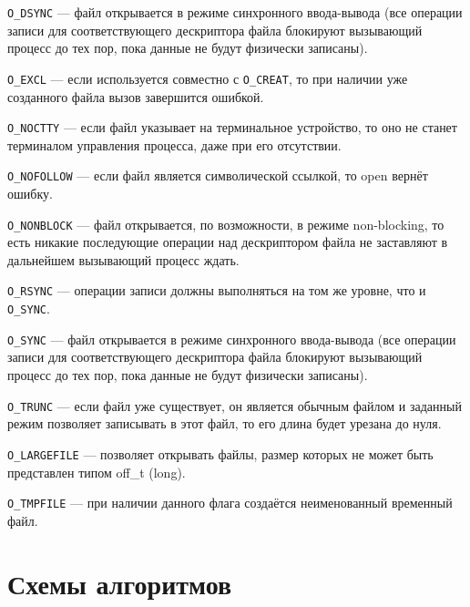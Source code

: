 \texttt{O\_DSYNC} --- файл открывается в режиме синхронного ввода-вывода (все операции записи для соответствующего дескриптора файла блокируют вызывающий процесс до тех пор, пока данные не будут физически записаны).

\texttt{O\_EXCL} --- если используется совместно с \texttt{O\_CREAT}, то при наличии уже созданного файла вызов завершится ошибкой.

\texttt{O\_NOCTTY} --- если файл указывает на терминальное устройство, то оно не станет терминалом управления процесса, даже при его отсутствии.

\texttt{O\_NOFOLLOW} --- если файл является символической ссылкой, то open вернёт ошибку.

\texttt{O\_NONBLOCK} --- файл открывается, по возможности, в режиме non-blocking, то есть никакие последующие операции над дескриптором файла не заставляют в дальнейшем вызывающий процесс ждать.

\texttt{O\_RSYNC} --- операции записи должны выполняться на том же уровне, что и \texttt{O\_SYNC}.

\texttt{O\_SYNC} --- файл открывается в режиме синхронного ввода-вывода (все операции записи для соответствующего дескриптора файла блокируют вызывающий процесс до тех пор, пока данные не будут физически записаны).

\texttt{O\_TRUNC} --- если файл уже существует, он является обычным файлом и заданный режим позволяет записывать в этот файл, то его длина будет урезана до нуля.

\texttt{O\_LARGEFILE} --- позволяет открывать файлы, размер которых не может быть представлен типом off\_t (long).

\texttt{O\_TMPFILE} --- при наличии данного флага создаётся неименованный временный файл.

\chapter{Схемы алгоритмов}









